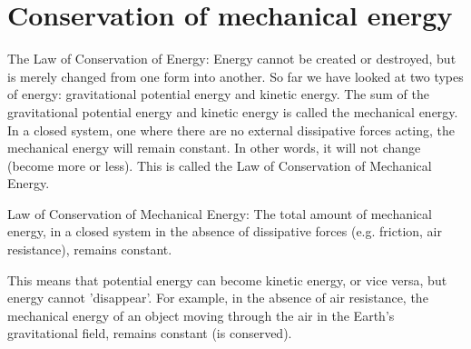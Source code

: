 \section{Conservation of mechanical energy}\nopagebreak
{} { The Law of Conservation of Energy: Energy cannot be created or destroyed, but is merely changed from one form into another.  } 
        \label{m38786*id68483}So far we have looked at two types of energy: gravitational potential energy and kinetic energy. 
The sum of the gravitational potential energy and kinetic energy is called the mechanical energy. 
In a closed system, one where there are no external dissipative forces acting, the mechanical energy will remain constant. 
In other words, it will not change (become more or less). This is called the Law of Conservation of Mechanical Energy. 

 { Law of Conservation of Mechanical Energy: The total amount of mechanical energy, in a closed system in the absence of dissipative forces (e.g. friction, air resistance), remains constant.  } 

This means that potential energy can become kinetic energy, or vice versa, but energy cannot 'disappear'. 
For example, in the absence of air resistance, the mechanical energy of an object moving through the air in the Earth's gravitational field, remains constant (is conserved).


% 



